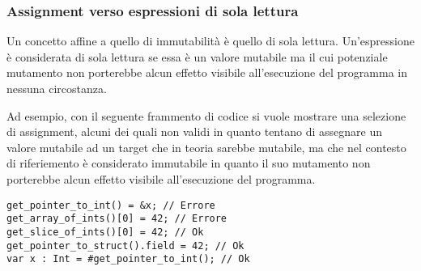 \subsubsection{Assignment verso espressioni di sola lettura}
Un concetto affine a quello di immutabilità è quello di sola lettura. Un'espressione è 
considerata di sola lettura se essa è un valore mutabile ma il cui potenziale mutamento 
non porterebbe alcun effetto visibile all'esecuzione del programma in nessuna circostanza.

Ad esempio, con il seguente frammento di codice si vuole mostrare una selezione di assignment, 
alcuni dei quali non validi in quanto tentano di assegnare un valore mutabile ad un target che 
in teoria sarebbe mutabile, ma che nel contesto di riferiemento è considerato immutabile in quanto 
il suo mutamento non porterebbe alcun effetto visibile all'esecuzione del programma. \\

\begin{lstlisting}[frame=single]
get_pointer_to_int() = &x; // Errore
get_array_of_ints()[0] = 42; // Errore
get_slice_of_ints()[0] = 42; // Ok
get_pointer_to_struct().field = 42; // Ok
var x : Int = #get_pointer_to_int(); // Ok
\end{lstlisting}
\vspace{0.5cm}